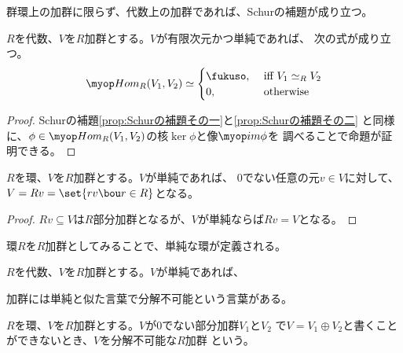 	群環上の加群に限らず、代数上の加群であれば、Schurの補題が成り立つ。

	\begin{proposition}[Schurの補題その三]\label{prop:Schurの補題その三} %
		$R$を代数、$V$を$R$加群とする。$V$が有限次元かつ単純であれば、
		次の式が成り立つ。
		\begin{equation*}\begin{split} %
			\Hom_R(V_1,V_2) \simeq \begin{cases}
				\fukuso, &\text{ iff }V_1 \simeq_R V_2 \\
				0, &\text{ otherwise } \\
			\end{cases}
		\end{split}\end{equation*} %
	\end{proposition} %
	\begin{proof} %
		Schurの補題\ref{prop:Schurの補題その一}と\ref{prop:Schurの補題その二}
		と同様に、$\phi\in\Hom_R(V_1,V_2)$の核$\ker\phi$と像$\im\phi$を
		調べることで命題が証明できる。
	\end{proof} %

	\begin{proposition}[単純な加群は巡回的]\label{prop:単純な加群は巡回的} %
		$R$を環、$V$を$R$加群とする。$V$が単純であれば、
		$0$でない任意の元$v\in V$に対して、$V=Rv=\set{rv\bou r\in R}$となる。
	\end{proposition} %
	\begin{proof} %
		$Rv\subseteq V$は$R$部分加群となるが、$V$が単純ならば$Rv=V$となる。
	\end{proof} %

	環$R$を$R$加群としてみることで、単純な環が定義される。
	
	\begin{definition}[単純な環]\label{def:単純な環} %
		$R$を代数、$V$を$R$加群とする。$V$が単純であれば、
	\end{definition} %

	加群には単純と似た言葉で分解不可能という言葉がある。

	\begin{definition}[分解不可能な加群]\label{def:分解不可能な加群} %
		$R$を環、$V$を$R$加群とする。$V$が$0$でない部分加群$V_1$と$V_2$
		で$V=V_1\oplus V_2$と書くことができないとき、$V$を分解不可能な$R$加群
		という。
	\end{definition} %

